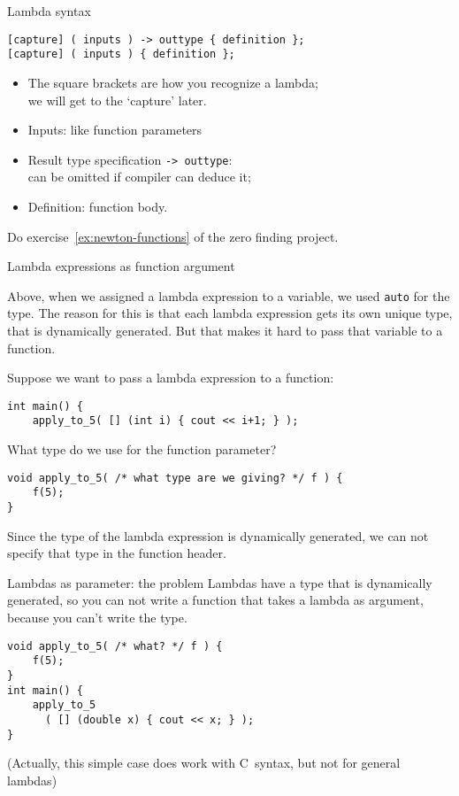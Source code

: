 \begin{slide}{Lambda syntax}
  \label{sl:lambda-syntax}
\begin{lstlisting}
[capture] ( inputs ) -> outtype { definition };
[capture] ( inputs ) { definition };  
\end{lstlisting}
  \begin{itemize}
  \item The square brackets are how you recognize a lambda;\\
    we will get to the `capture' later.
  \item Inputs: like function parameters
  \item Result type specification \lstinline+-> outtype+:\\
    can be omitted if compiler can deduce it;
  \item Definition: function body.
  \end{itemize}
\end{slide}

\begin{exercise}
  Do exercise~\ref{ex:newton-functions} of the zero finding project.
\end{exercise}

 {Lambda expressions as function argument}
\label{sec:lambdaauto}

Above, when we assigned a lambda expression to a variable,
we used \lstinline{auto} for the type.
The reason for this is that each lambda expression gets its own
unique type, that is dynamically generated.
But that makes it hard to pass that variable to a function.

Suppose we want to pass a lambda expression to a function:
\begin{lstlisting}
int main() {
    apply_to_5( [] (int i) { cout << i+1; } );
\end{lstlisting}
What type do we use for the function parameter?
\begin{lstlisting}
void apply_to_5( /* what type are we giving? */ f ) {
    f(5);
}
\end{lstlisting}
Since the type of the lambda expression is dynamically generated,
we can not specify that type in the function header.

\begin{slide}{Lambdas as parameter: the problem}
  \label{sl:lambda-apply5}
  Lambdas have a type that is dynamically  generated,
  so you can not write a function
  that takes a lambda as argument, because you can't write the type.
  
  \lstset{numbers=left,numberstyle=\tiny}
\begin{lstlisting}
void apply_to_5( /* what? */ f ) {
    f(5);
}
int main() {
    apply_to_5
      ( [] (double x) { cout << x; } );
}
\end{lstlisting}
(Actually, this simple case does work with C~syntax,
but not for general lambdas)
\end{slide}

